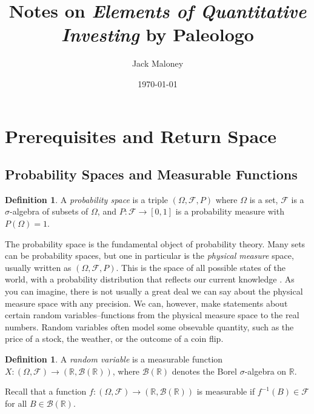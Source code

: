 \documentclass[11pt,reqno]{amsart}
\theoremstyle{definition}
\newtheorem{definition}[theorem]{Definition}
\theoremstyle{remark}
\begin{document}
\title{Notes on \textit{Elements of Quantitative Investing} by Paleologo}
\author{Jack Maloney}
\date{\today}

\maketitle

\tableofcontents

\section{Prerequisites and Return Space}

\subsection{Probability Spaces and Measurable Functions}

\begin{definition}
	A \emph{probability space} is a triple $(\Omega, \mathcal{F}, P)$ where $\Omega$ is a set, $\mathcal{F}$ is a $\sigma$-algebra of subsets of $\Omega$, and $P: \mathcal{F} \to [0,1]$ is a probability measure with $P(\Omega) = 1$.
\end{definition}

The probability space is the fundamental object of probability theory. Many sets can be probability spaces, but one in particular is the \emph{physical measure} space, usually written as $(\Omega, \mathcal{F}, P)$.
This is the space of all possible states of the world, with a probability distribution that reflects our current knowledge \cite{clayton2023bernoulli}.
As you can imagine, there is not usually a great deal we can say about the physical measure space with any precision.
We can, however, make statements about certain random variables--functions from the physical measure space to the real numbers.
Random variables often model some obsevable quantity, such as the price of a stock, the weather, or the outcome of a coin flip.

\begin{definition}
	A \emph{random variable} is a measurable function $X: (\Omega, \mathcal{F}) \to (\mathbb{R}, \mathcal{B}(\mathbb{R}))$, where $\mathcal{B}(\mathbb{R})$ denotes the Borel $\sigma$-algebra on $\mathbb{R}$.

	Recall that a function $f: (\Omega, \mathcal{F}) \to (\mathbb{R}, \mathcal{B}(\mathbb{R}))$ is measurable if $f^{-1}(B) \in \mathcal{F}$ for all $B \in \mathcal{B}(\mathbb{R})$.
\end{definition}
\end{document}
